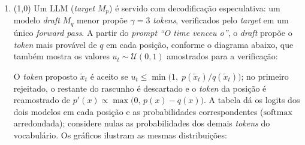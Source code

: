 \documentclass[11pt,a4paper]{article}
\begin{document}
\begin{enumerate}[1)]
\pagebreak
\item (1{,}0) Um LLM (\textit{target} $M_p$) é servido com decodificação especulativa: um modelo \textit{draft} $M_q$ menor propõe $\gamma = 3$ \textit{tokens}, verificados pelo \textit{target} em um único \textit{forward pass}. A partir do \textit{prompt} \textit{``O time venceu o''}, o \textit{draft} propõe o \textit{token} mais provável de $q$ em cada posição, conforme o diagrama abaixo, que também mostra os valores $u_t \sim \mathcal{U}(0,1)$ amostrados para a verificação:

\begin{center}
\end{center}

O \textit{token} proposto $\tilde{x}_t$ é aceito se $u_t \le \min\bigl(1,\; p(\tilde{x}_t)/q(\tilde{x}_t)\bigr)$; no primeiro rejeitado, o restante do rascunho é descartado e o \textit{token} da posição é reamostrado de $p'(x) \propto \max\bigl(0,\, p(x) - q(x)\bigr)$. A tabela dá os logits dos dois modelos em cada posição e as probabilidades correspondentes ($\mathrm{softmax}$ arredondada); considere nulas as probabilidades dos demais \textit{tokens} do vocabulário. Os gráficos ilustram as mesmas distribuições:


\end{enumerate}
\end{document}
